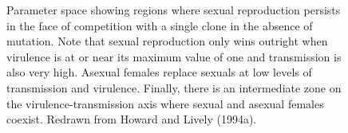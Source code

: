 \documentclass[
  letterpaper,
]{book}
\begin{document}
\begin{figure}


\caption[Parameter space showing regions where sexual reproduction
persists in the face of competition with a single clone in the absence
of mutation]{\label{fig-6-4}Parameter space showing regions where sexual
reproduction persists in the face of competition with a single clone in
the absence of mutation. Note that sexual reproduction only wins
outright when virulence is at or near its maximum value of one and
transmission is also very high. Asexual females replace sexuals at low
levels of transmission and virulence. Finally, there is an intermediate
zone on the virulence-transmission axis where sexual and asexual females
coexist. Redrawn from Howard and Lively (1994a).}

\end{figure}%
\end{document}
